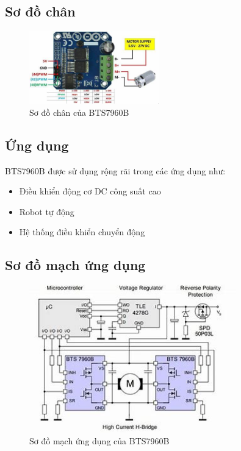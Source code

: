         \subsection{Sơ đồ chân}
            \begin{figure}[H]
                \centering
                \includegraphics[width=0.5\textwidth]{pictures/bts7960b_pinout.png}
                \caption{Sơ đồ chân của BTS7960B}
            \end{figure}
            
        \subsection{Ứng dụng}
            BTS7960B được sử dụng rộng rãi trong các ứng dụng như:
            \begin{itemize}
                \item Điều khiển động cơ DC công suất cao
                \item Robot tự động
                \item Hệ thống điều khiển chuyển động
            \end{itemize}
            
        \subsection{Sơ đồ mạch ứng dụng}
            \begin{figure}[H]
                \centering
                \includegraphics[width=0.8\textwidth]{pictures/bts7960b_application_circuit.png}
                \caption{Sơ đồ mạch ứng dụng của BTS7960B}
            \end{figure}
            
